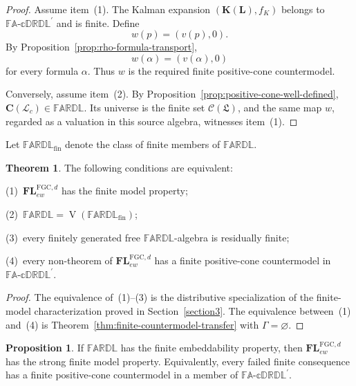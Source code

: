 \documentclass[final,12pt,times]{elsarticle}
\theoremstyle{plain}
\theoremstyle{definition}
\newtheorem{theorem}[definition]{Theorem}
\newtheorem{proposition}[definition]{Proposition}
\theoremstyle{break}
\newcommand{\FARDL}{\mathbb{FARDL}}
\newcommand{\CFADp}{\mathbb{FA\text{-}cDRDL}^{\prime}}
\newcommand{\Cfun}{\mathbf C}
\begin{document}
\begin{proof}
Assume item~(1).  The Kalman expansion \((\mathbf K(\mathbf{L}),f_K)\) belongs to
\(\CFADp\) and is finite.  Define
\[
 w(p)=(v(p),0).
\]
By Proposition~\ref{prop:rho-formula-transport},
\[
 w(\alpha)=(v(\alpha),0)
\]
for every formula \(\alpha\).  Thus \(w\) is the required finite
positive-cone countermodel.

Conversely, assume item~(2).  By
Proposition~\ref{prop:positive-cone-well-defined},
\(\Cfun(\mathcal{\mathscr L}_c)\in\FARDL\).  Its universe is the finite set
\(\mathcal C(\boldsymbol{\mathfrak L})\), and the same map \(w\), regarded
as a valuation in this source algebra, witnesses item~(1).
\end{proof}

Let \(\FARDL_{\mathrm{fin}}\) denote the class of finite members of
\(\FARDL\).

\begin{theorem}
\label{thm:finite-model-characterization}
The following conditions are equivalent:

(1)\ \(\mathbf{FL}^{\mathrm{FGC},d}_{ew}\) has the finite model property;

(2)\ \(\FARDL=\operatorname{V}(\FARDL_{\mathrm{fin}})\);

(3)\ every finitely generated free \(\FARDL\)-algebra is residually finite;

(4)\ every non-theorem of \(\mathbf{FL}^{\mathrm{FGC},d}_{ew}\) has a
      finite positive-cone countermodel in \(\CFADp\).
\end{theorem}

\begin{proof}
The equivalence of~(1)--(3) is the distributive specialization of the
finite-model characterization proved in Section~\ref{section3}.  The
equivalence between~(1) and~(4) is
Theorem~\ref{thm:finite-countermodel-transfer} with \(\Gamma=\varnothing\).
\end{proof}

\begin{proposition}
\label{prop:finite-embeddability-criterion}
If \(\FARDL\) has the finite embeddability property, then
\(\mathbf{FL}^{\mathrm{FGC},d}_{ew}\) has the strong finite model property.
Equivalently, every failed finite consequence has a finite positive-cone
countermodel in a member of \(\CFADp\).
\end{proposition}
\end{document}
